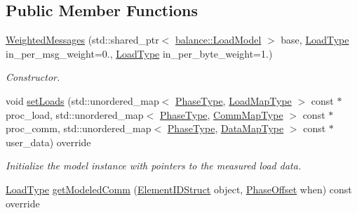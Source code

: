 \subsection*{Public Member Functions}
\begin{DoxyCompactItemize}
\item 
\hyperlink{structvt_1_1vrt_1_1collection_1_1balance_1_1_weighted_messages_a702340c1de974e4e616057a776b903d6}{Weighted\+Messages} (std\+::shared\+\_\+ptr$<$ \hyperlink{structvt_1_1vrt_1_1collection_1_1balance_1_1_load_model}{balance\+::\+Load\+Model} $>$ base, \hyperlink{namespacevt_a8fb51741340b87d7aaee0bef60e9896b}{Load\+Type} in\+\_\+per\+\_\+msg\+\_\+weight=0., \hyperlink{namespacevt_a8fb51741340b87d7aaee0bef60e9896b}{Load\+Type} in\+\_\+per\+\_\+byte\+\_\+weight=1.)
\begin{DoxyCompactList}\small\item\em Constructor. \end{DoxyCompactList}\item 
void \hyperlink{structvt_1_1vrt_1_1collection_1_1balance_1_1_weighted_messages_aced294a1e3e528a3c6b00051ed2258eb}{set\+Loads} (std\+::unordered\+\_\+map$<$ \hyperlink{namespacevt_a46ce6733d5cdbd735d561b7b4029f6d7}{Phase\+Type}, \hyperlink{namespacevt_1_1vrt_1_1collection_1_1balance_a5339303db2e1ce964d783a53fd74e6b1}{Load\+Map\+Type} $>$ const $\ast$proc\+\_\+load, std\+::unordered\+\_\+map$<$ \hyperlink{namespacevt_a46ce6733d5cdbd735d561b7b4029f6d7}{Phase\+Type}, \hyperlink{namespacevt_1_1vrt_1_1collection_1_1balance_a01ee1fb0ae2da1d2ab7fdca3be9ae351}{Comm\+Map\+Type} $>$ const $\ast$proc\+\_\+comm, std\+::unordered\+\_\+map$<$ \hyperlink{namespacevt_a46ce6733d5cdbd735d561b7b4029f6d7}{Phase\+Type}, \hyperlink{namespacevt_1_1vrt_1_1collection_1_1balance_acf152c668ed9e2e9c6b29784181d2435}{Data\+Map\+Type} $>$ const $\ast$user\+\_\+data) override
\begin{DoxyCompactList}\small\item\em Initialize the model instance with pointers to the measured load data. \end{DoxyCompactList}\item 
\hyperlink{namespacevt_a8fb51741340b87d7aaee0bef60e9896b}{Load\+Type} \hyperlink{structvt_1_1vrt_1_1collection_1_1balance_1_1_weighted_messages_a5f5d0c9259b71f373beda65ba5585b87}{get\+Modeled\+Comm} (\hyperlink{namespacevt_1_1vrt_1_1collection_1_1balance_a9f5b53fafb270212279a4757d2c4cd28}{Element\+I\+D\+Struct} object, \hyperlink{structvt_1_1vrt_1_1collection_1_1balance_1_1_phase_offset}{Phase\+Offset} when) const override
\end{DoxyCompactItemize}
